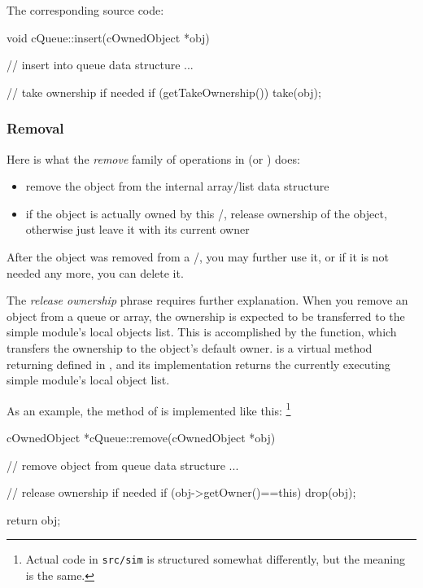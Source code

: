 The corresponding source code:

\begin{cpp}
void cQueue::insert(cOwnedObject *obj)
{
    // insert into queue data structure
    ...

    // take ownership if needed
    if (getTakeOwnership())
        take(obj);

}
\end{cpp}


\subsubsection{Removal}

Here is what the \textit{remove} family of operations in 
(or ) does:

\begin{itemize}
    \item{remove the object from the internal array/list data structure}

    \item{if the object is actually owned by this /,
    release ownership of the object, otherwise just leave it with
    its current owner}
\end{itemize}

After the object was removed from a /,
you may further use it, or if it is not needed any more, you can delete it.

The \textit{release ownership} phrase requires further explanation.
When you remove an object from a queue or array, the ownership
is expected to be transferred to the simple module's local objects list.
This is accomplished by the  function, which transfers the
ownership to the object's default owner.
 is a virtual method returning 
defined in , and its implementation returns
the currently executing simple module's local object list.

As an example, the  method of  is
implemented like this:
  \footnote{Actual code in \texttt{src/sim} is structured somewhat
  differently, but the meaning is the same.}

\begin{cpp}
cOwnedObject *cQueue::remove(cOwnedObject *obj)
{
    // remove object from queue data structure
    ...

    // release ownership if needed
    if (obj->getOwner()==this)
        drop(obj);

    return obj;
}
\end{cpp}


